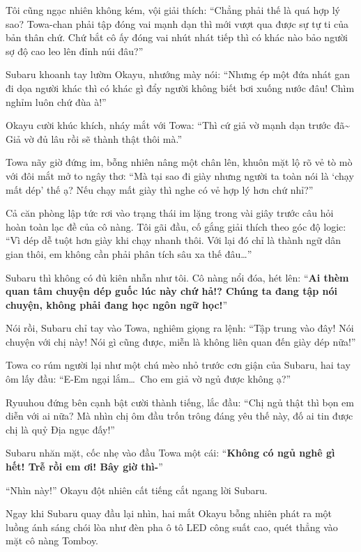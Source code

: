 \documentclass[../main.tex]{subfiles}
\begin{document}
Tôi cũng ngạc nhiên không kém, vội giải thích: ``Chẳng phải thế là quá hợp lý sao? Towa-chan phải tập đóng vai mạnh dạn thì mới vượt qua được sự tự ti của bản thân chứ. Chứ bắt cô ấy đóng vai nhút nhát tiếp thì có khác nào bảo người sợ độ cao leo lên đỉnh núi đâu?''

Subaru khoanh tay lườm Okayu, nhướng mày nói: ``Nhưng ép một đứa nhát gan đi dọa người khác thì có khác gì đẩy người không biết bơi xuống nước đâu! Chìm nghỉm luôn chứ đùa à!''

Okayu cười khúc khích, nháy mắt với Towa: ``Thì cứ giả vờ mạnh dạn trước đã\~{} Giả vờ đủ lâu rồi sẽ thành thật thôi mà.''

Towa nãy giờ đứng im, bỗng nhiên nâng một chân lên, khuôn mặt lộ rõ vẻ tò mò với đôi mắt mở to ngây thơ: ``Mà tại sao đi giày nhưng người ta toàn nói là `chạy mất dép' thế ạ? Nếu chạy mất giày thì nghe có vẻ hợp lý hơn chứ nhỉ?''

Cả căn phòng lập tức rơi vào trạng thái im lặng trong vài giây trước câu hỏi hoàn toàn lạc đề của cô nàng. Tôi gãi đầu, cố gắng giải thích theo góc độ logic: ``Vì dép dễ tuột hơn giày khi chạy nhanh thôi. Với lại đó chỉ là thành ngữ dân gian thôi, em không cần phải phân tích sâu xa thế đâu\dots''


Subaru thì không có đủ kiên nhẫn như tôi. Cô nàng nổi đóa, hét lên: ``\textbf{Ai thèm quan tâm chuyện dép guốc lúc này chứ hả!? Chúng ta đang tập nói chuyện, không phải đang học ngôn ngữ học!}''

Nói rồi, Subaru chỉ tay vào Towa, nghiêm giọng ra lệnh: ``Tập trung vào đây! Nói chuyện với chị này! Nói gì cũng được, miễn là không liên quan đến giày dép nữa!''

Towa co rúm người lại như một chú mèo nhỏ trước cơn giận của Subaru, hai tay ôm lấy đầu: ``E-Em ngại lắm\dots\ Cho em giả vờ ngủ được không ạ?''


Ryuuhou đứng bên cạnh bật cười thành tiếng, lắc đầu: ``Chị ngủ thật thì bọn em diễn với ai nữa? Mà nhìn chị ôm đầu trốn trông đáng yêu thế này, đố ai tin được chị là quỷ Địa ngục đấy!''

Subaru nhăn mặt, cốc nhẹ vào đầu Towa một cái: ``\textbf{Không có ngủ nghê gì hết! Trễ rồi em ơi! Bây giờ thì-}''

``Nhìn này!'' Okayu đột nhiên cất tiếng cắt ngang lời Subaru.

Ngay khi Subaru quay đầu lại nhìn, hai mắt Okayu bỗng nhiên phát ra một luồng ánh sáng chói lòa như đèn pha ô tô LED công suất cao, quét thẳng vào mặt cô nàng Tomboy.
\end{document}
